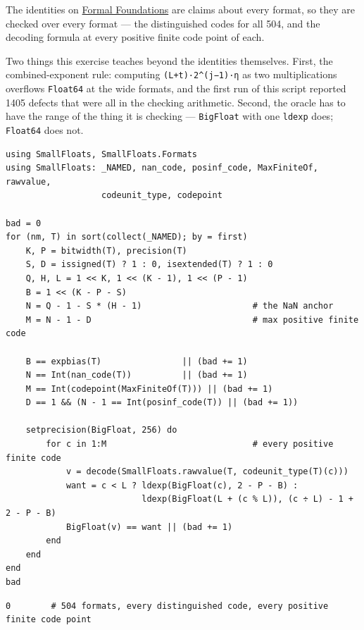 \label{17299558508911646514}{}


The identities on \href{concept\_\allowbreak{}codepoint\_\allowbreak{}algebra.md}{Formal Foundations} are claims about every format, so they are checked over every format — the distinguished codes for all 504, and the decoding formula at every positive finite code point of each.



Two things this exercise teaches beyond the identities themselves. First, the combined-exponent rule: computing \texttt{(L+t)·2{\textasciicircum}(j−1)·η} as two multiplications overflows \texttt{Float64} at the wide formats, and the first run of this script reported 1405 {\textquotedbl}defects{\textquotedbl} that were all in the checking arithmetic. Second, the oracle has to have the range of the thing it is checking — \texttt{BigFloat} with one \texttt{ldexp} does; \texttt{Float64} does not.




\begin{minipage}{\linewidth}
\begin{verbatim}
using SmallFloats, SmallFloats.Formats
using SmallFloats: _NAMED, nan_code, posinf_code, MaxFiniteOf, rawvalue,
                   codeunit_type, codepoint

bad = 0
for (nm, T) in sort(collect(_NAMED); by = first)
    K, P = bitwidth(T), precision(T)
    S, D = issigned(T) ? 1 : 0, isextended(T) ? 1 : 0
    Q, H, L = 1 << K, 1 << (K - 1), 1 << (P - 1)
    B = 1 << (K - P - S)
    N = Q - 1 - S * (H - 1)                      # the NaN anchor
    M = N - 1 - D                                # max positive finite code

    B == expbias(T)                || (bad += 1)
    N == Int(nan_code(T))          || (bad += 1)
    M == Int(codepoint(MaxFiniteOf(T))) || (bad += 1)
    D == 1 && (N - 1 == Int(posinf_code(T)) || (bad += 1))

    setprecision(BigFloat, 256) do
        for c in 1:M                             # every positive finite code
            v = decode(SmallFloats.rawvalue(T, codeunit_type(T)(c)))
            want = c < L ? ldexp(BigFloat(c), 2 - P - B) :
                           ldexp(BigFloat(L + (c % L)), (c ÷ L) - 1 + 2 - P - B)
            BigFloat(v) == want || (bad += 1)
        end
    end
end
bad
\end{verbatim}




\begin{verbatim}
0        # 504 formats, every distinguished code, every positive finite code point
\end{verbatim}
\end{minipage}




